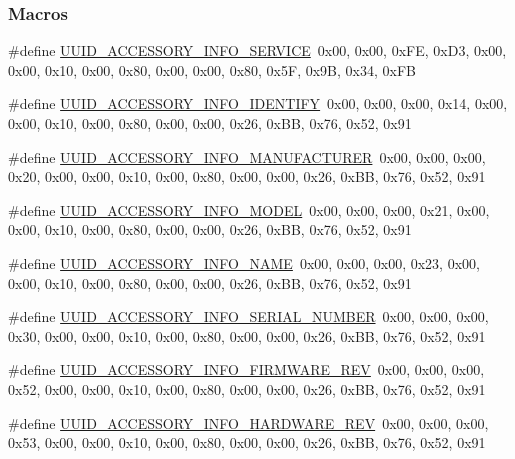 \subsubsection*{Macros}
\begin{DoxyCompactItemize}
\item 
\#define \hyperlink{group___h_a_i_s_ga09404e67cd6d7488a2e6575c91b6de7a}{U\+U\+I\+D\+\_\+\+A\+C\+C\+E\+S\+S\+O\+R\+Y\+\_\+\+I\+N\+F\+O\+\_\+\+S\+E\+R\+V\+I\+CE}~0x00, 0x00, 0x\+F\+E, 0x\+D3, 0x00, 0x00, 0x10, 0x00, 0x80, 0x00, 0x00, 0x80, 0x5\+F, 0x9\+B, 0x34, 0x\+FB
\item 
\#define \hyperlink{group___h_a_i_s_ga1efc610091d00ec88fe11b22d9b3d94b}{U\+U\+I\+D\+\_\+\+A\+C\+C\+E\+S\+S\+O\+R\+Y\+\_\+\+I\+N\+F\+O\+\_\+\+I\+D\+E\+N\+T\+I\+FY}~0x00, 0x00, 0x00, 0x14, 0x00, 0x00, 0x10, 0x00, 0x80, 0x00, 0x00, 0x26, 0x\+B\+B, 0x76, 0x52, 0x91
\item 
\#define \hyperlink{group___h_a_i_s_ga9cf3c580e3e2a62206582d1d3e1c7f81}{U\+U\+I\+D\+\_\+\+A\+C\+C\+E\+S\+S\+O\+R\+Y\+\_\+\+I\+N\+F\+O\+\_\+\+M\+A\+N\+U\+F\+A\+C\+T\+U\+R\+ER}~0x00, 0x00, 0x00, 0x20, 0x00, 0x00, 0x10, 0x00, 0x80, 0x00, 0x00, 0x26, 0x\+B\+B, 0x76, 0x52, 0x91
\item 
\#define \hyperlink{group___h_a_i_s_ga6e735cbeaed5c13f22a21c479e76db0c}{U\+U\+I\+D\+\_\+\+A\+C\+C\+E\+S\+S\+O\+R\+Y\+\_\+\+I\+N\+F\+O\+\_\+\+M\+O\+D\+EL}~0x00, 0x00, 0x00, 0x21, 0x00, 0x00, 0x10, 0x00, 0x80, 0x00, 0x00, 0x26, 0x\+B\+B, 0x76, 0x52, 0x91
\item 
\#define \hyperlink{group___h_a_i_s_ga4a8bed994dc53152e62148f2a6479e55}{U\+U\+I\+D\+\_\+\+A\+C\+C\+E\+S\+S\+O\+R\+Y\+\_\+\+I\+N\+F\+O\+\_\+\+N\+A\+ME}~0x00, 0x00, 0x00, 0x23, 0x00, 0x00, 0x10, 0x00, 0x80, 0x00, 0x00, 0x26, 0x\+B\+B, 0x76, 0x52, 0x91
\item 
\#define \hyperlink{group___h_a_i_s_gaba1996c3809b6fa9e7b83a08e371d185}{U\+U\+I\+D\+\_\+\+A\+C\+C\+E\+S\+S\+O\+R\+Y\+\_\+\+I\+N\+F\+O\+\_\+\+S\+E\+R\+I\+A\+L\+\_\+\+N\+U\+M\+B\+ER}~0x00, 0x00, 0x00, 0x30, 0x00, 0x00, 0x10, 0x00, 0x80, 0x00, 0x00, 0x26, 0x\+B\+B, 0x76, 0x52, 0x91
\item 
\#define \hyperlink{group___h_a_i_s_ga366a27a3597dd6259db3a4bbafa29649}{U\+U\+I\+D\+\_\+\+A\+C\+C\+E\+S\+S\+O\+R\+Y\+\_\+\+I\+N\+F\+O\+\_\+\+F\+I\+R\+M\+W\+A\+R\+E\+\_\+\+R\+EV}~0x00, 0x00, 0x00, 0x52, 0x00, 0x00, 0x10, 0x00, 0x80, 0x00, 0x00, 0x26, 0x\+B\+B, 0x76, 0x52, 0x91
\item 
\#define \hyperlink{group___h_a_i_s_gac6636bd0c5b6dfe15b67707ef1757063}{U\+U\+I\+D\+\_\+\+A\+C\+C\+E\+S\+S\+O\+R\+Y\+\_\+\+I\+N\+F\+O\+\_\+\+H\+A\+R\+D\+W\+A\+R\+E\+\_\+\+R\+EV}~0x00, 0x00, 0x00, 0x53, 0x00, 0x00, 0x10, 0x00, 0x80, 0x00, 0x00, 0x26, 0x\+B\+B, 0x76, 0x52, 0x91

\end{DoxyCompactItemize}
